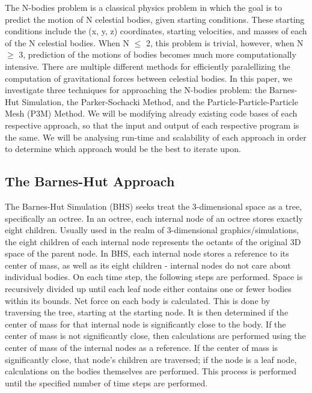 \documentclass[11pt]{article}
\begin{document}
The N-bodies problem is a classical physics problem in which the goal is to predict the motion of N celestial bodies, given starting conditions. 
These starting conditions include the (x, y, z) coordinates, starting velocities, and masses of each of the N celestial bodies. When N $\le$ 2, this problem is trivial, however, when N $\ge$ 3, prediction of the motions of bodies becomes much more computationally intensive. There are multiple different methods for efficiently paralellizing the computation of gravitational forces between celestial bodies.
\newline \newline
In this paper, we investigate three techniques for approaching the N-bodies problem: the Barnes-Hut Simulation, the Parker-Sochacki Method, and the Particle-Particle-Particle Mesh (P3M) Method. We will be modifying already existing code bases of each respective approach, so that the input and output of each respective program is the same. We will be analysing run-time and scalability of each approach in order to determine which approach would be the best to iterate upon.
\begin{center}
\section*{The Barnes-Hut Approach}
\end{center}
The Barnes-Hut Simulation (BHS) seeks treat the 3-dimensional space as a tree, specifically an octree. In an octree, each internal node of an octree stores exactly eight children. Usually used in the realm of 3-dimensional graphics/simulations, the eight children of each internal node represents the octants of the original 3D space of the parent node. In BHS, each internal node stores a reference to its center of mass, as well as its eight children - internal nodes do not care about individual bodies. 
\newline \newline 
On each time step, the following steps are performed. Space is recursively divided up until each leaf node either contains one or fewer bodies within its bounds. Net force on each body is calculated. This is done by traversing the tree, starting at the starting node. It is then determined if the center of mass for that internal node is significantly close to the body. If the center of mass is not significantly close, then calculations are performed using the center of mass of the internal nodes as a reference. If the center of mass is significantly close, that node's children are traversed; if the node is a leaf node, calculations on the bodies themselves are performed. This process is performed until the specified number of time steps are performed.
\end{document}

